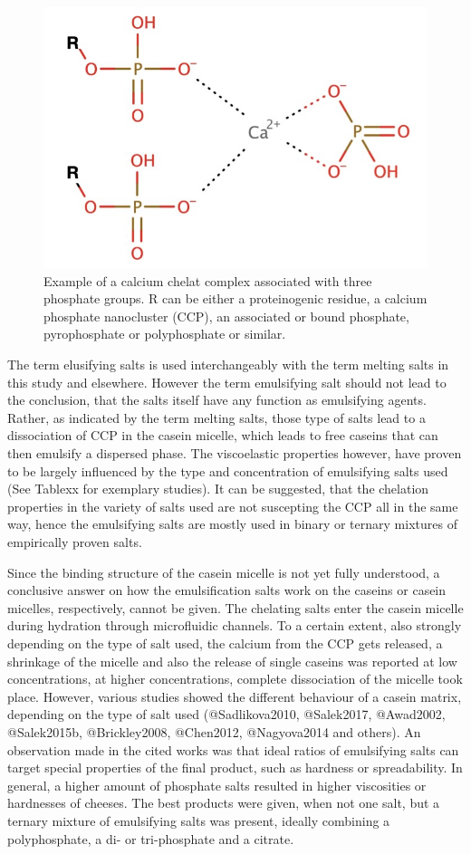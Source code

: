 \documentclass[
]{article}
\begin{document}
\begin{figure}
\includegraphics[width=0.3\linewidth]{images/Ca_chelat} \caption{Example of a calcium chelat complex associated with three phosphate groups. R can be either a proteinogenic residue, a calcium phosphate nanocluster (CCP), an associated or bound phosphate, pyrophosphate or polyphosphate or similar.}\label{fig:unnamed-chunk-8}
\end{figure}

The term elusifying salts is used interchangeably with the term melting
salts in this study and elsewhere. However the term emulsifying salt
should not lead to the conclusion, that the salts itself have any
function as emulsifying agents. Rather, as indicated by the term melting
salts, those type of salts lead to a dissociation of CCP in the casein
micelle, which leads to free caseins that can then emulsify a dispersed
phase. The viscoelastic properties however, have proven to be largely
influenced by the type and concentration of emulsifying salts used (See
Tablexx for exemplary studies). It can be suggested, that the chelation
properties in the variety of salts used are not suscepting the CCP all
in the same way, hence the emulsifying salts are mostly used in binary
or ternary mixtures of empirically proven salts.

Since the binding structure of the casein micelle is not yet fully
understood, a conclusive answer on how the emulsification salts work on
the caseins or casein micelles, respectively, cannot be given. The
chelating salts enter the casein micelle during hydration through
microfluidic channels. To a certain extent, also strongly depending on
the type of salt used, the calcium from the CCP gets released, a
shrinkage of the micelle and also the release of single caseins was
reported at low concentrations, at higher concentrations, complete
dissociation of the micelle took place. However, various studies showed
the different behaviour of a casein matrix, depending on the type of
salt used (@Sadlikova2010, @Salek2017, @Awad2002, @Salek2015b,
@Brickley2008, @Chen2012, @Nagyova2014 and others). An observation made
in the cited works was that ideal ratios of emulsifying salts can target
special properties of the final product, such as hardness or
spreadability. In general, a higher amount of phosphate salts resulted
in higher viscosities or hardnesses of cheeses. The best products were
given, when not one salt, but a ternary mixture of emulsifying salts was
present, ideally combining a polyphosphate, a di- or tri-phosphate and a
citrate.
\end{document}
